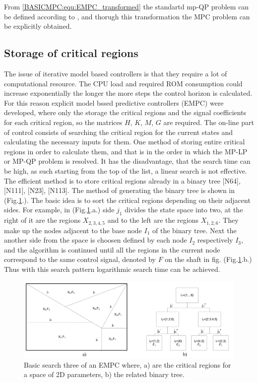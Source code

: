 		From \ref{BASICMPC:equ:EMPC_transformed} the standartd mp-QP problem can be defined according to \cite{borrelli2017predictive}, and thorugh this transformation the MPC problem can be explicitly obtained. 
		

\subsection{Storage of critical regions}\label{BASICCSR:sec:EMPCStorage}

The issue of iterative model based controllers is that they require a lot of computational resource. The CPU load and required ROM consumption could increase exponentially the longer the more steps the control horizon is calculated. For this reason explicit model bssed predictive controllers (EMPC) were developed, where only the storage the critical regions and the signal coefficients for each critical region, so the matrices $H$, $K$, $M$, $G$ are required. The on-line part of control consists of searching the critical region for the current states and calculating the necessary inputs for them.
One method of storing entire critical regions in order to calculate them, and that is in the order in which the MP-LP or MP-QP problem is resolved. It has the disadvantage, that the search time can be high, as such starting from the top of the list, a linear search is not effective. The efficient method is to store critical regions already in a binary tree [N64], [N111], [N23], [N113]. The method of generating the binary tree is shown in (Fig.\ref{BASICMPC:fig:searchtree}.). The basic idea is to sort the critical regions
depending on their adjacent sides. For example, in (Fig.\ref{BASICMPC:fig:searchtree}.a.) side $j_1$ divides the state space into two, at the right of it are the regions $X_{2,3,4,5}$ and to the left are the regions $X_{1,2,6}$. They make up the nodes adjacent to the base node $I_1$ of the binary tree. Next the another side from the space is choosen defined by each node $I_2$ respectively $I_3$, and the algorithm is continued until all the regions in the current node correspond to the same control signal, denoted by $F$ on the shaft in fig. (Fig.\ref{BASICMPC:fig:searchtree}.b.) Thus with this search pattern logarithmic search time can be achieved.

 \begin{figure}[!ht]
        \centering
        \includegraphics[width=\textwidth]{EMPC_PNG_Pics/BasicSearchTree.png}
        \caption{Basic search three of an EMPC where, a) are the critical regions for a space of 2D parameters,
b) the related binary tree.}
        \label{BASICMPC:fig:searchtree}
    \end{figure}

